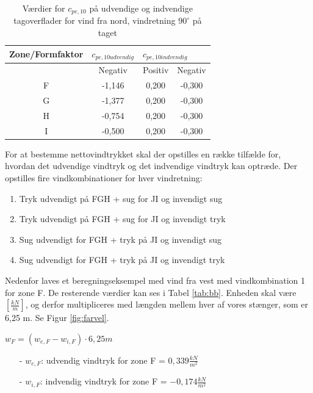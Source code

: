 \begin{table}[htb]
	\begin{center}
		\begin{tabular}{ |c|c|c|c| } 
			\hline
			Zone/Formfaktor & $c_{pe,10 udvendig}$ & \multicolumn{2}{l|}{$c_{pe,10 indvendig}$} \\	\hline
			& Negativ & Positiv & Negativ \\ \hline
			F & -1,146 & 0,200 & -0,300 \\	\hline
			G & -1,377 & 0,200 & -0,300 \\	\hline 
			H & -0,754 & 0,200 & -0,300 \\ 	\hline
			I & -0,500 & 0,200 & -0,300 \\	\hline
		\end{tabular}
		\caption{Værdier for $c_{pe,10}$ på udvendige og indvendige tagoverflader for vind fra nord, vindretning $90^{\circ}$ på taget}
		\label{tab:kk}
	\end{center}
\end{table}

For at bestemme nettovindtrykket skal der opstilles en række tilfælde for, hvordan det udvendige vindtryk og det indvendige vindtryk kan optræde.  
\newline
\newline
Der opstilles fire vindkombinationer for hver vindretning:
\begin{enumerate}
	\item Tryk udvendigt på FGH + sug for JI og invendigt sug
	\item Tryk udvendigt på FGH + sug for JI og invendigt tryk
	\item Sug udvendigt for FGH + tryk på JI og invendigt sug
	\item Sug udvendigt for FGH + tryk på JI og invendigt tryk
\end{enumerate}

Nedenfor laves et beregningseksempel med vind fra vest med vindkombination 1 for zone F. De resterende værdier kan ses i Tabel \ref{tab:bb}.
\newline
\newline
Enheden skal være $[\frac{kN}{m}]$, og derfor multipliceres med længden mellem hver af vores stænger, som er 6,25 m. Se Figur \ref{fig:farvel}.

\begin{center} 
	$w_F=(w_{e,F}-w_{i,F})\cdot 6,\!25 m$
\end{center}

\begin{itemize}
	\item[-] $w_{e,F}$: udvendig vindtryk for zone F = $0,\!339 \frac{kN}{m^2}$
	\item[-] $w_{i,F}$: indvendig vindtryk for zone F = $-0,\!174 \frac{kN}{m^2}$
\end{itemize}


